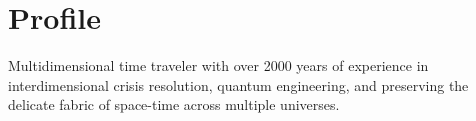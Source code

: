 \section*{Profile}
Multidimensional time traveler with over 2000 years of experience in interdimensional crisis resolution, 
quantum engineering, and preserving the delicate fabric of space-time across multiple universes.
